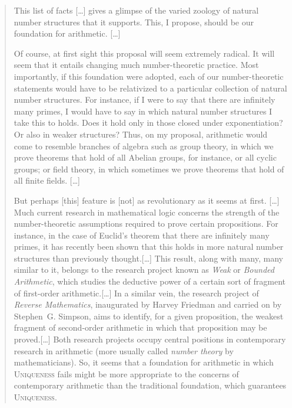 \documentclass{bhamthesis}
\theoremstyle{definition}
\begin{document}
\begin{quotation}
 This list of facts [\ldots] gives a glimpse of the varied zoology
 of natural number structures that it supports.  This, I propose,
 should be our foundation for arithmetic.  [\ldots]

 Of course, at first sight this proposal will seem extremely
 radical. It will seem that it entails changing much
 number-theoretic practice.  Most importantly, if this foundation
 were adopted, each of our number-theoretic statements would have
 to be relativized to a particular collection of natural number
 structures.  For instance, if I were to say that there are
 infinitely many primes, I would have to say in which natural
 number structures I take this to holds.  Does it hold only in
 those closed under exponentiation?  Or also in weaker structures?
 Thus, on my proposal, arithmetic would come to resemble branches
 of algebra such as group theory, in which we prove theorems that
 hold of all Abelian groups, for instance, or all cyclic groups;
 or field theory, in which sometimes we prove theorems that hold
 of all finite fields.  [\ldots]

 But perhaps [this] feature is [not] as revolutionary as it seems
 at first.  [\ldots]  Much current research in mathematical logic
 concerns the strength of the number-theoretic assumptions
 required to prove certain propositions.  For instance, in the
 case of Euclid's theorem that there are infinitely many primes,
 it has recently been shown that this holds in more natural number
 structures than previously thought.[\ldots]  This result, along
 with many, many similar to it, belongs to the research project
 known as \emph{Weak} or \emph{Bounded Arithmetic}, which studies
 the deductive power of a certain sort of fragment of first-order
 arithmetic.[\ldots]  In a similar vein, the research project of
 \emph{Reverse Mathematics}, inaugurated by Harvey Friedman and
 carried on by Stephen~G. Simpson, aims to identify, for a given
 proposition, the weakest fragment of second-order arithmetic in
 which that proposition may be proved.[\ldots]  Both research
 projects occupy central positions in contemporary research in
 arithmetic (more usually called \emph{number theory} by
 mathematicians).  So, it seems that a foundation for arithmetic
 in which \textsc{Uniqueness} fails might be more appropriate to
 the concerns of contemporary arithmetic than the traditional
 foundation, which guarantees \textsc{Uniqueness}.


\end{quotation}
\end{document}
